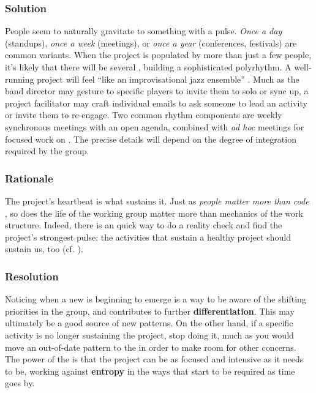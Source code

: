 \subsubsection*{Solution} People seem to naturally gravitate to something with a pulse.  \emph{Once a day} (standups), \emph{once a week} (meetings), or \emph{once a year} (conferences, festivals) are common variants.  When the project is populated by more than just a few people, it's likely that there will be several , building a sophisticated polyrhythm.  A well-running project will feel ``like an improvisational jazz ensemble'' \cite{david2001software}.  Much as the band director may gesture to specific players to invite them to solo or sync up, a project facilitator may craft individual emails to ask someone to lead an activity or invite them to re-engage.  Two common rhythm components are weekly synchronous meetings with an open agenda, combined with \emph{ad hoc} meetings for focused work on .  The precise details will depend on the degree of integration required by the group.

\subsubsection*{Rationale}  The project's heartbeat is what sustains it. Just as \emph{people matter more than code} \cite{torvalds-interview}, so does the life of the working group matter more than mechanics of the work structure.  Indeed, there is an quick way to do a reality check and find the project's strongest pulse: the activities that sustain a healthy project should sustain us, too (cf. ).

\subsubsection*{Resolution} Noticing when a new  is beginning to emerge is a way to be aware of the shifting priorities in the group, and contributes to further \textbf{differentiation}.  This may ultimately be a good source of new patterns. On the other hand, if a specific activity is no longer sustaining the project, stop doing it, much as you would move an out-of-date pattern to the  in order to make room for other concerns. The power of the  is that the project can be as focused and intensive as it needs to be, working against \textbf{entropy} in the ways that start to be required as time goes by.


